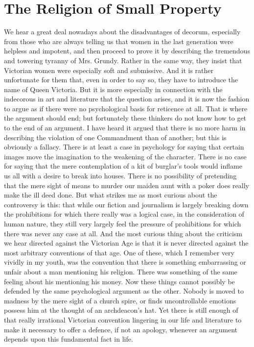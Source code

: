 \documentclass{book}
\begin{document}
\chapter{The Religion of Small Property}
\label{chapter-21}
We hear a great deal nowadays about the disadvantages of decorum, especially from those who are always telling us that women in the last generation were helpless and impotent, and then proceed to prove it by describing the tremendous and towering tyranny of Mrs. Grundy. Rather in the same way, they insist that Victorian women were especially soft and submissive. And it is rather unfortunate for them that, even in order to say so, they have to introduce the name of Queen Victoria. But it is more especially in connection with the indecorous in art and literature that the question arises, and it is now the fashion to argue as if there were no psychological basis for reticence at all. That is where the argument should end; but fortunately these thinkers do not know how to get to the end of an argument. I have heard it argued that there is no more harm in describing the violation of one Commandment than of another; but this is obviously a fallacy. There is at least a case in psychology for saying that certain images move the imagination to the weakening of the character. There is no case for saying that the mere contemplation of a kit of burglar’s tools would inflame us all with a desire to break into houses. There is no possibility of pretending that the mere sight of means to murder our maiden aunt with a poker does really make the ill deed done. But what strikes me as most curious about the controversy is this: that while our fiction and journalism is largely breaking down the prohibitions for which there really was a logical case, in the consideration of human nature, they still very largely feel the pressure of prohibitions for which there was never any case at all. And the most curious thing about the criticism we hear directed against the Victorian Age is that it is never directed against the most arbitrary conventions of that age. One of these, which I remember very vividly in my youth, was the convention that there is something embarrassing or unfair about a man mentioning his religion. There was something of the same feeling about his mentioning his money. Now these things cannot possibly be defended by the same psychological argument as the other. Nobody is moved to madness by the mere sight of a church spire, or finds uncontrollable emotions possess him at the thought of an archdeacon’s hat. Yet there is still enough of that really irrational Victorian convention lingering in our life and literature to make it necessary to offer a defence, if not an apology, whenever an argument depends upon this fundamental fact in life.
\end{document}
